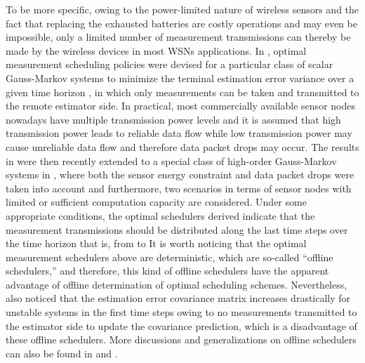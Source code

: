 \documentclass[journal]{IEEEtran}
\begin{document}
 To be more specific, owing to the power-limited nature of wireless sensors and the fact that replacing the exhausted batteries are costly operations and may even be impossible, only a limited number of measurement transmissions can thereby be made by the wireless devices in most WSNs applications. In \cite{tac2009savage}, optimal measurement scheduling policies were devised for a particular class of scalar Gauss-Markov systems to minimize the terminal estimation error variance over a given time horizon , \iffalse say  \fi in which only  measurements can be taken and transmitted to the remote estimator side. In practical, most commercially available sensor nodes nowadays have multiple transmission power levels \cite{tsp2006luo} and it is assumed that high transmission power leads to reliable data flow while low transmission power may cause unreliable data flow \cite{auto2011shi} and therefore data packet drops may occur. {\color{black}The results in \cite{tac2009savage} were then recently extended to a special class of high-order Gauss-Markov systems in \cite{tsp2012shixie}, where both the sensor energy constraint and data packet drops were taken into account and furthermore, two scenarios in terms of sensor nodes with limited or sufficient computation capacity are considered. Under some appropriate conditions, the optimal schedulers derived indicate that the  measurement transmissions should be distributed along the last  time steps over the time horizon  that is, from  to  It is worth noticing that the optimal measurement schedulers above are deterministic, which are so-called ``offline schedulers,''  and therefore, this kind of offline schedulers have the apparent advantage of offline determination of optimal scheduling schemes. Nevertheless, also noticed that the estimation error covariance matrix increases drastically for unstable systems in the first  time steps owing to no measurements transmitted to the estimator side to update the covariance prediction, which is a disadvantage of these offline schedulers. More discussions and generalizations on offline schedulers can also be found in \cite{auto2011shi} and \cite{tsp2011yang}.}
\end{document}
